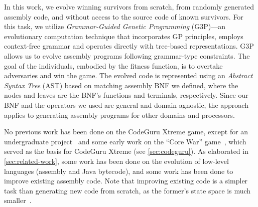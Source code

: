 \documentclass[dvipsnames, format=sigconf]{acmart}
\begin{document}
In this work, we evolve winning survivors from scratch, \ie from randomly generated assembly code, and without access to the source code of known survivors. For this task, we utilize \textit{Grammar-Guided Genetic Programming} (G3P)---an evolutionary computation technique that incorporates GP principles, employs context-free grammar and operates directly with tree-based representations. G3P allows us to evolve assembly programs following grammar-type constraints. The goal of the individuals, embodied by the fitness function, is to overtake adversaries and win the game. The evolved code is represented using an \textit{Abstract Syntax Tree} (AST) based on matching assembly BNF we defined, where the nodes and leaves are the BNF's functions and terminals, respectively. Since our BNF and the operators we used are general and domain-agnostic, the approach applies to generating assembly programs for other domains and processors.


No previous work has been done on the CodeGuru Xtreme game, except for an undergraduate project~\cite{Darwin8086} and some early work on the ``Core War'' game~\cite{Andersen2001TheGE, corno2003exploiting}, which served as the basis for CodeGuru Xtreme (see \autoref{sec:codeguru}). As elaborated in \autoref{sec:related-work}, some work has been done on the evolution of low-level languages (\ie assembly and Java bytecode), and some work has been done %
to improve existing assembly code. Note that improving existing code is a simpler task than generating new code from scratch, as the former's state space is much smaller~\cite{Petke2018GeneticImprovementSoftware, Banzhaf2018SomeRemarksCode}. %

\end{document}
